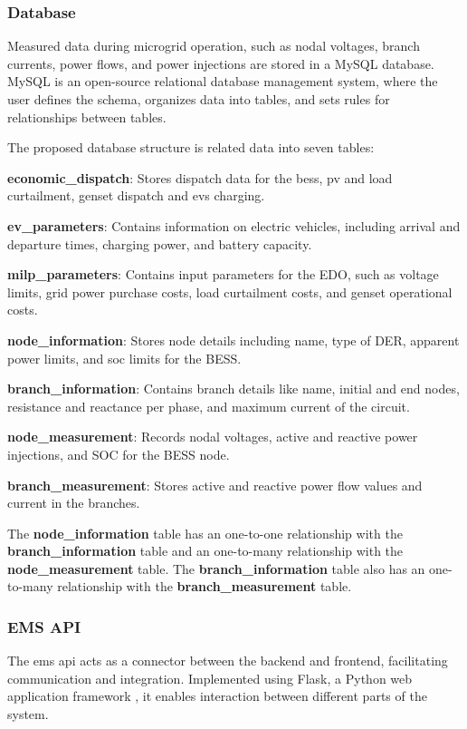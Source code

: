 \documentclass[preprint, 10pt, 5p]{elsarticle}
\begin{document}
\subsubsection{Database}

Measured data during microgrid operation, such as nodal voltages, 
branch currents, power flows, and power injections are stored in a MySQL 
\cite{mysql} database. MySQL is an open-source relational database management 
system, where the user defines the schema, organizes data into tables, 
and sets rules for relationships between tables.

The proposed database structure is related data into seven tables:

\textbf{economic\_dispatch}: Stores dispatch data for the \gls{bess}, 
\gls{pv} and load curtailment, genset dispatch and \glspl{ev} charging.

\textbf{ev\_parameters}: Contains information on electric vehicles, 
including arrival and departure times, charging power, and battery capacity.

\textbf{milp\_parameters}: Contains input parameters for the EDO, 
such as voltage limits, grid power purchase costs, load curtailment costs, 
and genset operational costs.

\textbf{node\_information}: Stores node details including  name, type of DER, 
apparent power limits, and \gls{soc} limits for the BESS.

\textbf{branch\_information}: Contains branch details like name, initial and 
end nodes, resistance and reactance per phase, and maximum current of the circuit.

\textbf{node\_measurement}: Records nodal voltages, active and reactive 
power injections, and SOC for the BESS node.

\textbf{branch\_measurement}: Stores active and reactive power flow values 
and current in the branches.

The \textbf{node\_information} table has an one-to-one relationship with 
the \textbf{branch\_information} table and an one-to-many relationship with 
the \textbf{node\_measurement} table. The \textbf{branch\_information} 
table also has an one-to-many relationship with the \textbf{branch\_measurement} table.

\subsubsection{EMS API}

The \gls{ems} \gls{api} acts as a connector between the backend and frontend, 
facilitating communication and integration. Implemented using Flask, a Python 
web application framework \cite{flask}, it enables interaction between different parts of 
the system. 
\end{document}
